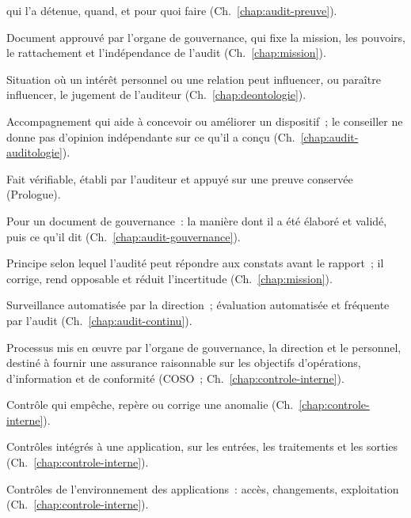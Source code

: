 \begin{description}
          qui l'a détenue, quand, et pour quoi faire (Ch.~\ref{chap:audit-preuve}).
    \item[Charte d'audit] Document approuvé par l'organe de gouvernance, qui
          fixe la mission, les pouvoirs, le rattachement et l'indépendance
          de l'audit (Ch.~\ref{chap:mission}).
    \item[Conflit d'intérêts] Situation où un intérêt personnel ou une
          relation peut influencer, ou paraître influencer, le jugement de
          l'auditeur (Ch.~\ref{chap:deontologie}).
    \item[Conseil] Accompagnement qui aide à concevoir ou améliorer un
          dispositif~; le conseiller ne donne pas d'opinion indépendante sur
          ce qu'il a conçu (Ch.~\ref{chap:audit-auditologie}).
    \item[Constatation] Fait vérifiable, établi par l'auditeur et appuyé
          sur une preuve conservée (Prologue).
    \item[Contenant et contenu] Pour un document de gouvernance~: la manière
          dont il a été élaboré et validé, puis ce qu'il dit
          (Ch.~\ref{chap:audit-gouvernance}).
    \item[Contradictoire] Principe selon lequel l'audité peut répondre aux
          constats avant le rapport~; il corrige, rend opposable et réduit
          l'incertitude (Ch.~\ref{chap:mission}).
    \item[Contrôle continu, audit continu] Surveillance automatisée par la
          direction~; évaluation automatisée et fréquente par l'audit
          (Ch.~\ref{chap:audit-continu}).
    \item[Contrôle interne] Processus mis en œuvre par l'organe de
          gouvernance, la direction et le personnel, destiné à fournir une
          assurance raisonnable sur les objectifs d'opérations,
          d'information et de conformité (COSO~; Ch.~\ref{chap:controle-interne}).
    \item[Contrôle préventif, détectif, correctif] Contrôle qui empêche,
          repère ou corrige une anomalie (Ch.~\ref{chap:controle-interne}).
    \item[Contrôles d'application] Contrôles intégrés à une application,
          sur les entrées, les traitements et les sorties
          (Ch.~\ref{chap:controle-interne}).
    \item[Contrôles généraux informatiques] Contrôles de l'environnement
          des applications~: accès, changements, exploitation
          (Ch.~\ref{chap:controle-interne}).

\end{description}
